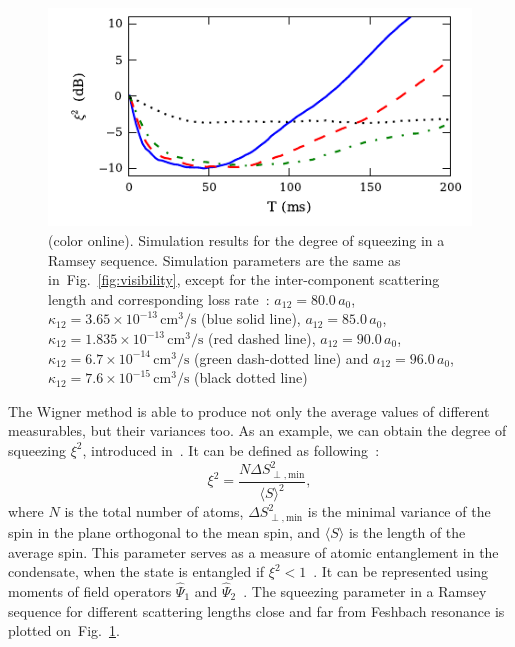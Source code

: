 \documentclass[aps,prl,twocolumn,showpacs,amsmath,amssymb,superscriptaddress]{revtex4-1}
\newcommand{\figref}[1]{Fig.~\ref{#1}}
\begin{document}
\begin{figure}
	\includegraphics{figures_generated/ramsey_squeezing.pdf}

	\caption{(color online).
	Simulation results for the degree of squeezing in a Ramsey sequence.
	Simulation parameters are the same as in~\figref{fig:visibility},
	except for the inter-component scattering length and corresponding loss rate~\cite{Kaufman2009}:
	$a_{12} = 80.0\,a_0$, $\kappa_{12} = 3.65 \times 10^{-13}\,\mathrm{cm^3/s}$ (blue solid line),
	$a_{12} = 85.0\,a_0$, $\kappa_{12} = 1.835 \times 10^{-13}\,\mathrm{cm^3/s}$ (red dashed line),
	$a_{12} = 90.0\,a_0$, $\kappa_{12} = 6.7 \times 10^{-14}\,\mathrm{cm^3/s}$ (green dash-dotted line) and
	$a_{12} = 96.0\,a_0$, $\kappa_{12} = 7.6 \times 10^{-15}\,\mathrm{cm^3/s}$ (black dotted line)}

	\label{fig:squeezing}
\end{figure}

The Wigner method is able to produce not only the average values of different measurables,
but their variances too.
As an example, we can obtain the degree of squeezing $\xi^2$, introduced in~\cite{Wineland1994,Sorensen2001}.
It can be defined as following~\cite{Li2009}:
\begin{equation}
\label{eqn:squeezing}
	\xi^2 = \frac{N \Delta S^2_{\perp, \mathrm{min}}}{\langle S \rangle^2},
\end{equation}
where $N$ is the total number of atoms,
$\Delta S^2_{\perp, \mathrm{min}}$ is the minimal variance of the spin in the plane orthogonal to the mean spin,
and $\langle S \rangle$ is the length of the average spin.
This parameter serves as a measure of atomic entanglement in the condensate,
when the state is entangled if $\xi^2 < 1$~\cite{Sorensen2001}.
It can be represented using moments of field operators $\widehat{\Psi}_1$
and $\widehat{\Psi}_2$~\cite{Li2009}.
The squeezing parameter in a Ramsey sequence for different scattering lengths
close and far from Feshbach resonance is plotted on~\figref{fig:squeezing}.
\end{document}
